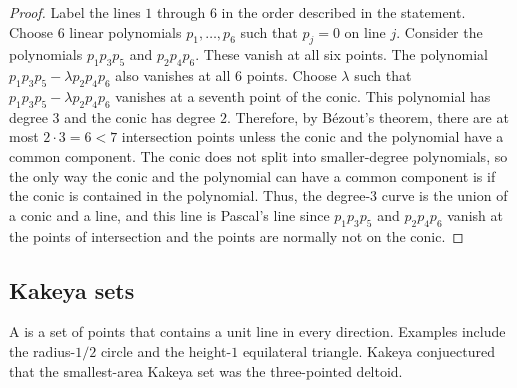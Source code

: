 \documentclass[11pt, oneside,margin=1in]{article}
\begin{document}
\begin{proof}
Label the lines $1$ through $6$ in the order described in the statement. Choose $6$ linear polynomials $p_1,\hdots, p_{6}$ such that $p_j = 0$ on line $j$. Consider the polynomials $p_1p_3p_5$ and $p_2p_4p_6$. These vanish at all six points. The polynomial $p_1p_3p_5 - \lambda p_2p_4p_6$ also vanishes at all $6$ points. Choose $\lambda$ such that $p_1p_3p_5 - \lambda p_2p_4p_6$ vanishes at a seventh point of the conic. This polynomial has degree $3$ and the conic has degree $2$. Therefore, by B\'ezout's theorem, there are at most $2\cdot 3 = 6<7$ intersection points unless the conic and the polynomial have a common component. The conic does not split into smaller-degree polynomials, so the only way the conic and the polynomial can have a common component is if the conic is contained in the polynomial. Thus, the degree-$3$ curve is the union of a conic and a line, and this line is Pascal's line since $p_1p_3p_5$ and $p_2p_4p_6$ vanish at the points of intersection and the points are normally not on the conic. 
\end{proof}



\subsection{Kakeya sets}
A  is a set of points that contains a unit line in every direction. Examples include the radius-$1/2$ circle and the height-$1$ equilateral triangle. Kakeya conjuectured that the smallest-area Kakeya set was the three-pointed deltoid.
\end{document}
